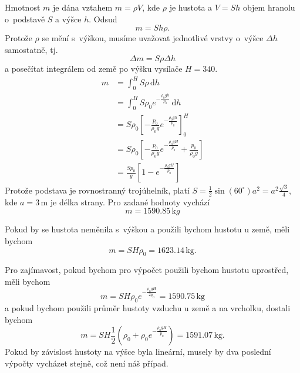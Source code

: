 \reseni
Hmotnost $m$ je dána vztahem $m=\rho V$, kde $\rho$ je hustota a $V=Sh$ objem hranolu o podstavě $S$ a výšce $h$. Odsud
\begin{equation*}
  m=Sh\rho.
\end{equation*}
Protože $\rho$ se mění s výškou, musíme uvažovat jednotlivé vrstvy o výšce $\Delta h$ samostatně, tj. 
\begin{equation*}
  \Delta m=S\rho \Delta h
\end{equation*}
a posečítat integrálem od země po výšku vysílače $H=340$.
\begin{equation*}
  \begin{aligned}
  m&=\int _0^{H}S\rho \,\mathrm d h \\&= \int_0^{H}S\rho_0 e^{-\frac {\rho _0 gh}{p_0}}\,\mathrm dh\\&=
   S\rho_0\left[-\frac {p_0}{\rho _0 g} e^{-\frac {\rho _0 gh}{p_0}}\right]_0^{H}
 \\&=  S\rho_0\left[-\frac {p_0}{\rho _0 g} e^{-\frac {\rho _0 g H}{p_0}}+\frac {p_0}{\rho _0 g}\right]
 \\&=  \frac { Sp_0}{ g}\left[1- e^{-\frac {\rho _0 g H}{p_0}}\right]
\end{aligned}
\end{equation*}
Protože podstava je rovnostranný trojúhelník, platí $S=\frac 12 \sin(60^\circ) a^2=a^2 \frac{\sqrt 3}{4}$, kde $a=3\,\mathrm m$ je délka strany. Pro zadané hodnoty vychází 
\begin{equation*}
  m= 1590.85 \,\mathrm kg
\end{equation*}

Pokud by se hustota neměnila s výškou a použili bychom hustotu u země, měli bychom
\begin{equation*}
  m=SH\rho_0=1623.14\,\mathrm{kg}.
\end{equation*}

Pro zajímavost, pokud bychom pro výpočet použili bychom hustotu uprostřed, měli bychom
\begin{equation*}
  m=SH  \rho_0 e^{-\frac {\rho _0 g H}{2p_0}}=1590.75\,\mathrm{kg}
\end{equation*}
a pokud bychom použili průměr hustoty vzduchu u země a na vrcholku, dostali bychom 
\begin{equation*}
  m=SH\frac 12 \left(  \rho_0 + \rho_0 e^{-\frac {\rho _0 g H}{p_0}}\right)=1591.07\,\mathrm{kg}.
\end{equation*}
Pokud by závislost hustoty na výšce byla lineární, musely by dva poslední výpočty vycházet stejně, což není náš případ.

